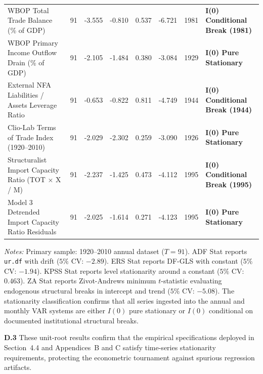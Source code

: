 \begin{landscape}
\begin{table}[p]
\begin{tabular}{l c c c c c c l}
WBOP Total Trade Balance (\% of GDP) & 91 & -3.555 & -0.810 & 0.537 & -6.721 & 1981 & \textbf{I(0) Conditional Break (1981)} \\
WBOP Primary Income Outflow Drain (\% of GDP) & 91 & -2.105 & -1.484 & 0.380 & -3.084 & 1929 & \textbf{I(0) Pure Stationary} \\
External NFA Liabilities / Assets Leverage Ratio & 91 & -0.653 & -0.822 & 0.811 & -4.749 & 1944 & \textbf{I(0) Conditional Break (1944)} \\
Clio-Lab Terms of Trade Index (1920--2010) & 91 & -2.029 & -2.302 & 0.259 & -3.090 & 1926 & \textbf{I(0) Pure Stationary} \\
Structuralist Import Capacity Ratio (TOT $\times$ X / M) & 91 & -2.237 & -1.425 & 0.473 & -4.112 & 1995 & \textbf{I(0) Conditional Break (1995)} \\
Model 3 Detrended Import Capacity Ratio Residuals & 91 & -2.025 & -1.614 & 0.271 & -4.123 & 1995 & \textbf{I(0) Pure Stationary} \\
\bottomrule
\end{tabular}
\begin{minipage}{0.95\linewidth}
\vspace{0.4em}
\footnotesize
\textit{Notes:} Primary sample: 1920--2010 annual dataset ($T=91$). ADF Stat reports \texttt{ur.df} with drift ($5\%$ CV: $-2.89$). ERS Stat reports DF-GLS with constant ($5\%$ CV: $-1.94$). KPSS Stat reports level stationarity around a constant ($5\%$ CV: $0.463$). ZA Stat reports Zivot-Andrews minimum $t$-statistic evaluating endogenous structural breaks in intercept and trend ($5\%$ CV: $-5.08$). The stationarity classification confirms that all series ingested into the annual and monthly VAR systems are either $I(0)$ pure stationary or $I(0)$ conditional on documented institutional structural breaks.
\end{minipage}
\end{table}
\end{landscape}

\textbf{D.3} These unit-root results confirm that the empirical specifications deployed in Section~4.4 and Appendices~B and C satisfy time-series stationarity requirements, protecting the econometric tournament against spurious regression artifacts.
